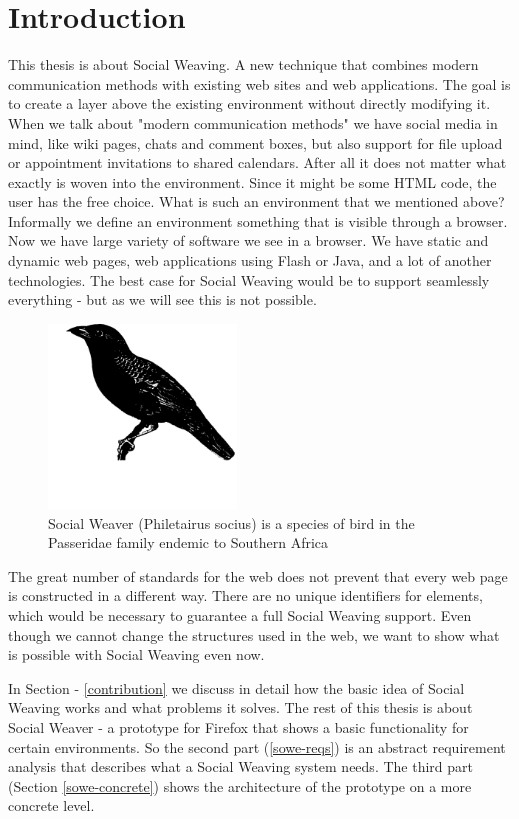 \section{Introduction}

This thesis is about Social Weaving. A new technique that combines modern communication methods with existing web sites and web applications. The goal is to create a layer above the existing environment without directly modifying it. When we talk about "modern communication methods" we have social media in mind, like wiki pages, chats and comment boxes, but also support for file upload or appointment invitations to shared calendars. After all it does
 not
 matter what exactly is woven into the environment. Since it might be some HTML code, the user has the free choice. What is such an environment that we mentioned above? Informally we define an environment something that is visible through a browser. Now we have large variety of software we see in a browser. We have static and dynamic web pages, web applications using Flash or Java, and a lot of another technologies. The best case for Social Weaving would be to support seamlessly everything - but as we will see this is not possible.

\begin{figure}[!h]\centering
		\includegraphics[width=5cm]{images/socialweaver.png}
		\caption{Social Weaver (Philetairus socius) is a species of bird in the Passeridae family endemic to Southern Africa}
		\label{socialweaver}
\end{figure} 

The great number of standards for the web does
 not
 prevent that every web page is constructed in a different way. There are no unique identifiers for elements, which would be necessary to guarantee a full Social Weaving support. Even though we cannot change the structures used in the web, we want to show what is possible with Social Weaving even now. 

In Section  - \ref{contribution} we discuss in detail how the basic idea of Social Weaving works and what problems it solves. The rest of this thesis is about Social Weaver - a prototype for Firefox that shows a basic functionality for certain environments. So the second part (\ref{sowe-reqs}) is an abstract requirement analysis that describes what a Social Weaving system needs. The third part (Section \ref{sowe-concrete}) shows the architecture of the prototype on a more concrete level.